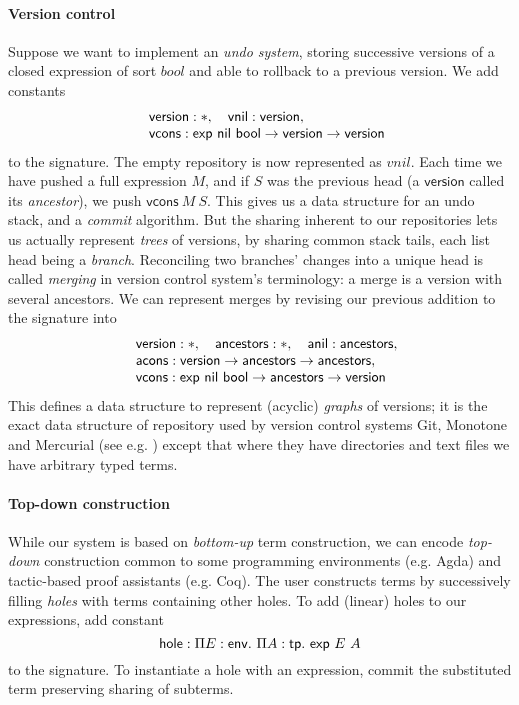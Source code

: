 \documentclass[9pt]{sigplanconf}
\begin{document}
\paragraph{Version control}

Suppose we want to implement an \emph{undo system}, storing successive
versions of a closed expression of sort $bool$ and able to rollback to
a previous version. We add constants
$$
\begin{array}{rl}
  &\mathsf{version} : \mathsf{*},\quad \mathsf{vnil} : \mathsf{version},\\
  &\mathsf{vcons} : \mathsf{exp}\ \mathsf{nil}\ \mathsf{bool} \to \mathsf{version} \to \mathsf{version}
\end{array}
$$
to the signature. The empty repository is now represented as
$vnil$. Each time we have pushed a full expression $M$, and if $S$ was
the previous head (a $\mathsf{version}$ called its \emph{ancestor}), we push
$\mathsf{vcons}\ M\ S$. This gives us a data structure for an undo stack, and a
\emph{commit} algorithm. But the sharing inherent to our repositories
lets us actually represent \emph{trees} of versions, by sharing common
stack tails, each list head being a \emph{branch}. Reconciling two
branches' changes into a unique head is called \emph{merging} in
version control system's terminology: a merge is a version with
several ancestors. We can represent merges by revising our previous
addition to the signature into
$$\begin{array}{rl}
  &\mathsf{version} : \mathsf{*},\quad
  \mathsf{ancestors} : \mathsf{*},\quad
  \mathsf{anil} : \mathsf{ancestors},\\
  &\mathsf{acons} : \mathsf{version} \to \mathsf{ancestors} \to \mathsf{ancestors},\\
  &\mathsf{vcons} : \mathsf{exp}\ \mathsf{nil}\ \mathsf{bool} \to \mathsf{ancestors} \to \mathsf{version}
\end{array}$$
This defines a data structure to represent (acyclic) \emph{graphs} of
versions; it is the exact data structure of repository used by version
control systems \textsf{Git}, \textsf{Monotone} and \textsf{Mercurial}
(see e.g. \cite{chacon2009git}) except that where they have directories
and text files we have arbitrary typed terms.

\paragraph{Top-down construction}

While our system is based on \emph{bottom-up} term construction, we
can encode \emph{top-down} construction common to some programming
environments (e.g. \textsf{Agda}) and tactic-based proof assistants
(e.g. \textsf{Coq}). The user constructs terms by
successively filling \emph{holes} with terms containing other
holes. To add (linear) holes to our expressions, add constant
$$ \mathsf{hole} : \Pi{E}:{\mathsf{env}}.\  \Pi{A}:{\mathsf{tp}}.\  \mathsf{exp}\ E\ A $$
to the signature. To instantiate a hole with an expression, commit the
substituted term preserving sharing of subterms.
\end{document}
